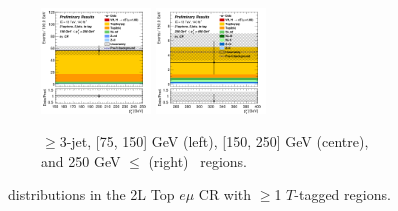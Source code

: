 \begin{figure}[h!]
\begin{subfigure}[b]{\textwidth}
        \includegraphics[width=0.32\textwidth]{Images/VH/Own_fit/postfit_VHcc/Region_distpTV_BMax250_BMin150_Dtopemucr_J3_TTypeta_T2_L2_Y6051_GlobalFit_conditionnal_mu1.png}
        \includegraphics[width=0.32\textwidth]{Images/VH/Own_fit/postfit_VHcc/Region_distpTV_BMax400_BMin250_Dtopemucr_J3_TTypeta_T2_L2_Y6051_GlobalFit_conditionnal_mu1.png}
        \caption{$\geq$3-jet, [75, 150] GeV (left), [150, 250] GeV (centre), and 250  GeV $\leq$ (right) \ptv\ regions.}
        \label{fig:plots_VHcc_2L_topCRemu_3J}
    \end{subfigure}
    \caption{\ptv\ distributions in the 2L Top $e\mu$ CR with $\geq$1 $T$-tagged regions.}
    \label{fig:plots_VHcc_2L_topCRemu}
\end{figure}
